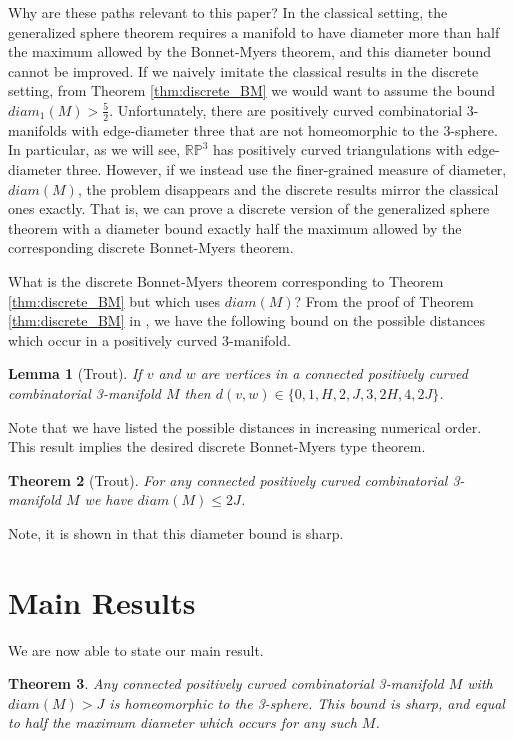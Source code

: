 \documentclass[12pt]{article}
\newtheorem{thm}{Theorem}[section]
\newtheorem{lem}[thm]{Lemma}
\begin{document}
Why are these paths relevant to this paper? In the classical setting, the generalized sphere theorem requires a manifold to have diameter more than half the maximum allowed by the Bonnet-Myers theorem, and this diameter bound cannot be improved. If we naively imitate the classical results in the discrete setting, from Theorem \ref{thm:discrete_BM} we would want to assume the bound $diam_1(M)>\frac{5}{2}$. Unfortunately, there are positively curved combinatorial 3-manifolds with edge-diameter three that are not homeomorphic to the 3-sphere. In particular, as we will see, $\mathbb{RP}^3$ has positively curved triangulations with edge-diameter three. However, if we instead use the finer-grained measure of diameter, $diam(M)$, the problem disappears and the discrete results mirror the classical ones exactly. That is, we can prove a discrete version of the generalized sphere theorem with a diameter bound exactly half the maximum allowed by the corresponding discrete Bonnet-Myers theorem.

What is the discrete Bonnet-Myers theorem corresponding to Theorem \ref{thm:discrete_BM} but which uses $diam(M)$? From the proof of Theorem \ref{thm:discrete_BM} in \cite{Trout10}, we have the following bound on the possible distances which occur in a positively curved 3-manifold.

\begin{lem}[Trout] If $v$ and $w$ are vertices in a connected positively curved combinatorial 3-manifold $M$ then $d(v,w) \in \{0, 1, H, 2, J, 3, 2H, 4, 2J \}$.
\end{lem}

\noindent Note that we have listed the possible distances in increasing numerical order. This result implies the desired discrete Bonnet-Myers type theorem.

\begin{thm}[Trout] For any connected positively curved combinatorial 3-manifold $M$ we have $diam(M) \leq 2J$.
\label{thm:discrete_BM_expanded_paths}
\end{thm}

\noindent Note, it is shown in \cite{Trout10} that this diameter bound is sharp.

\section{Main Results}

We are now able to state our main result.

\begin{thm} Any connected positively curved combinatorial 3-manifold $M$ with $diam(M)>J$ is homeomorphic to the 3-sphere. This bound is sharp, and equal to half the maximum diameter which occurs for any such $M$.
\label{thm:discrete_GS}
\end{thm}
\end{document}
